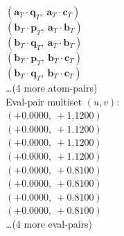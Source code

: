 \documentclass[a4paper,11pt]{article}
\newcommand{\fpbeomcfokjooi}[2]{\mathbf{#1}_T \cdot \mathbf{#2}_T}
\begin{document}
$(\fpbeomcfokjooi{a}{q},\ \fpbeomcfokjooi{a}{c})$\\
$(\fpbeomcfokjooi{b}{p},\ \fpbeomcfokjooi{a}{b})$\\
$(\fpbeomcfokjooi{b}{q},\ \fpbeomcfokjooi{a}{b})$\\
$(\fpbeomcfokjooi{b}{p},\ \fpbeomcfokjooi{b}{c})$\\
$(\fpbeomcfokjooi{b}{q},\ \fpbeomcfokjooi{b}{c})$\\
\quad \ldots (4 more atom-pairs)\\
\quad Eval-pair multiset $(u, v)$:\\
$(+0.0000,\ +1.1200)$\\
$(+0.0000,\ +1.1200)$\\
$(+0.0000,\ +1.1200)$\\
$(+0.0000,\ +1.1200)$\\
$(+0.0000,\ +0.8100)$\\
$(+0.0000,\ +0.8100)$\\
$(+0.0000,\ +0.8100)$\\
$(+0.0000,\ +0.8100)$\\
\quad \ldots (4 more eval-pairs)\\
\end{document}
